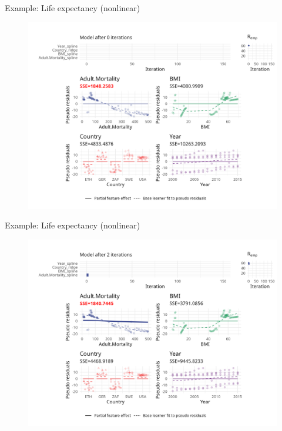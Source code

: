 
\begin{frame}{Example: Life expectancy (nonlinear)}
	\begin{figure}
		\centering
		\includegraphics[width=\textwidth]{figure/cwb-anim-nl/fig-iter-0001.png}
	\end{figure}
	\addtocounter{framenumber}{0}
\end{frame}


\begin{frame}{Example: Life expectancy (nonlinear)}
	\begin{figure}
		\centering
		\includegraphics[width=\textwidth]{figure/cwb-anim-nl/fig-iter-0002.png}
	\end{figure}
	\addtocounter{framenumber}{-1}
\end{frame}


